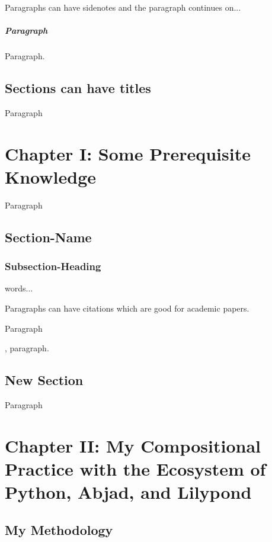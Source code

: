 \documentclass{tufte-book}
\begin{document}
Paragraphs can have sidenotes and the paragraph continues on...

\paragraph{Paragraph} Paragraph.

\section{Sections can have titles}

Paragraph


\chapter[Chapter I: Some Prerequisite Knowledge]{Chapter I: Some Prerequisite Knowledge}
\label{ch:prerequisites}

Paragraph

\section{Section-Name}\label{sec:section-name}
\subsection{Subsection-Heading}\label{sec:heading}
words...

Paragraphs can have citations \cite{citations} which are good for academic papers.

Paragraph

,\cite{citation} paragraph.

\section{New Section}

Paragraph

\chapter[Chapter II: My Compositional Practice with the Ecosystem of Python, Abjad, and Lilypond]{Chapter II: My Compositional Practice with the Ecosystem of Python, Abjad, and Lilypond}
\label{ch:practice}

\section{My Methodology}
\end{document}
